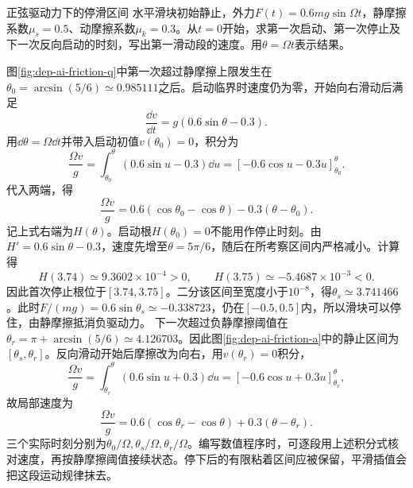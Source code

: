 \begin{example}正弦驱动力下的停滑区间
水平滑块初始静止，外力$F(t)=0.6mg\sin\Omega t$，静摩擦系数$\mu_s=0.5$、动摩擦系数$\mu_k=0.3$。从$t=0$开始，求第一次启动、第一次停止及下一次反向启动的时刻，写出第一滑动段的速度。用$\theta=\Omega t$表示结果。
\end{example}
\begin{solution}
图\ref{fig:dep-ai-friction-q}中第一次超过静摩擦上限发生在$\theta_0=\arcsin(5/6)\simeq0.985111$之后。启动临界时速度仍为零，开始向右滑动后满足
\[
 \frac{\dd v}{\dd t}=g(0.6\sin\theta-0.3).
\]
用$\dd\theta=\Omega\dd t$并带入启动初值$v(\theta_0)=0$，积分为
\[\frac{\Omega v}{g}=\int_{\theta_0}^{\theta}(0.6\sin u-0.3)\dd u
=[-0.6\cos u-0.3u]_{\theta_0}^{\theta}.\]
代入两端，得
\[
 \frac{\Omega v}{g}=0.6(\cos\theta_0-\cos\theta)-0.3(\theta-\theta_0).
\]
记上式右端为$H(\theta)$。启动根$H(\theta_0)=0$不能用作停止时刻。由$H'=0.6\sin\theta-0.3$，速度先增至$\theta=5\pi/6$，随后在所考察区间内严格减小。计算得
\[
H(3.74)\simeq9.3602\times10^{-4}>0,\qquad
H(3.75)\simeq-5.4687\times10^{-3}<0.
\]
因此首次停止根位于$[3.74,3.75]$。二分该区间至宽度小于$10^{-8}$，得$\theta_s\simeq3.741466$。此时$F/(mg)=0.6\sin\theta_s\simeq-0.338723$，仍在$[-0.5,0.5]$内，所以滑块可以停住，由静摩擦抵消负驱动力。
下一次超过负静摩擦阈值在$\theta_r=\pi+\arcsin(5/6)\simeq4.126703$。因此图\ref{fig:dep-ai-friction-a}中的静止区间为$[\theta_s,\theta_r]$。反向滑动开始后摩擦改为向右，用$v(\theta_r)=0$积分，
\[\frac{\Omega v}{g}=\int_{\theta_r}^{\theta}(0.6\sin u+0.3)\dd u
=[-0.6\cos u+0.3u]_{\theta_r}^{\theta},\]
故局部速度为
\[
 \frac{\Omega v}{g}=0.6(\cos\theta_r-\cos\theta)+0.3(\theta-\theta_r).
\]
三个实际时刻分别为$\theta_0/\Omega,\theta_s/\Omega,\theta_r/\Omega$。编写数值程序时，可逐段用上述积分式核对速度，再按静摩擦阈值接续状态。停下后的有限粘着区间应被保留，平滑插值会把这段运动规律抹去。
\end{solution}

